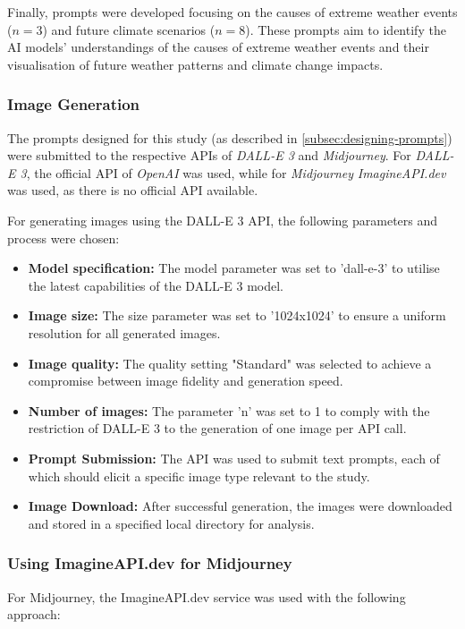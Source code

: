 Finally, prompts were developed focusing on the causes of extreme weather events ($n=3$) and future climate scenarios ($n=8$). These prompts aim to identify the AI models' understandings of the causes of extreme weather events and their visualisation of future weather patterns and climate change impacts.

\subsubsection{Image Generation}
The prompts designed for this study (as described in \ref{subsec:designing-prompts}) were submitted to the respective APIs of \textit{DALL-E 3} and \textit{Midjourney}. For \textit{DALL-E 3}, the official API of \textit{OpenAI} was used, while for \textit{Midjourney} \textit{ImagineAPI.dev} was used, as there is no official API available.

For generating images using the DALL-E 3 API, the following parameters and process were chosen:

\begin{itemize}
\item \textbf{Model specification:} The model parameter was set to 'dall-e-3' to utilise the latest capabilities of the DALL-E 3 model.
\item \textbf{Image size:} The size parameter was set to '1024x1024' to ensure a uniform resolution for all generated images.
\item \textbf{Image quality:} The quality setting "Standard" was selected to achieve a compromise between image fidelity and generation speed.
\item \textbf{Number of images:} The parameter 'n' was set to 1 to comply with the restriction of DALL-E 3 to the generation of one image per API call.
\item \textbf{Prompt Submission:} The API was used to submit text prompts, each of which should elicit a specific image type relevant to the study.
\item \textbf{Image Download:} After successful generation, the images were downloaded and stored in a specified local directory for analysis.
\end{itemize}

\subsubsection{Using ImagineAPI.dev for Midjourney}

For Midjourney, the ImagineAPI.dev service was used with the following approach:

